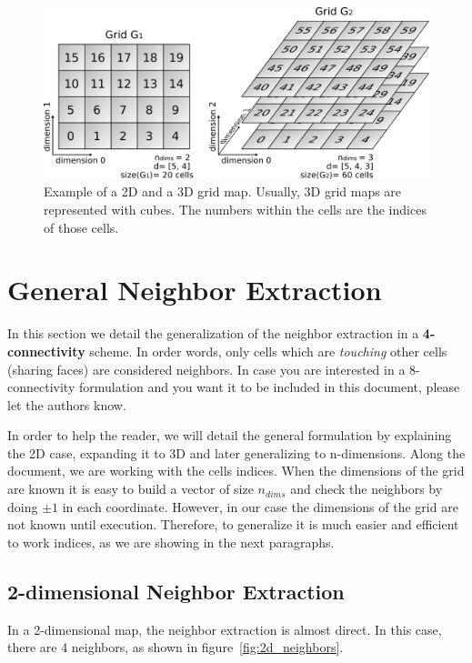 \documentclass[12pt]{article}
\begin{document}
\begin{figure}[ht]
    \centering
    \includegraphics[width=\textwidth]{grid_definitions}
    \caption{Example of a 2D and a 3D grid map. Usually, 3D grid maps are represented with cubes. The numbers within the cells are
    the indices of those cells.}
    \label{fig:grid_example}
\end{figure}


\section{General Neighbor Extraction}
In this section we detail the generalization of the neighbor extraction in a \textbf{4-connectivity} scheme. In order words,
only cells which are \emph{touching} other cells (sharing faces) are considered neighbors. In case you are interested in a 8-connectivity
formulation and you want it to be included in this document, please let the authors know.

In order to help the reader, we will detail the general formulation by explaining the 2D case, expanding it to 3D and later generalizing 
to n-dimensions. Along the document, we are working with the cells indices. When the dimensions of the grid are known it is easy
to build a vector of size $n_{dims}$ and check the neighbors by doing $\pm1$ in each coordinate. However, in our case the dimensions
of the grid are not known until execution. Therefore, to generalize it is much easier and efficient to work indices, as we are showing
in the next paragraphs.

\subsection{2-dimensional Neighbor Extraction}
In a 2-dimensional map, the neighbor extraction is almost direct. In this case, there are 4 neighbors, as shown in figure~\ref{fig:2d_neighbors}.
\end{document}
